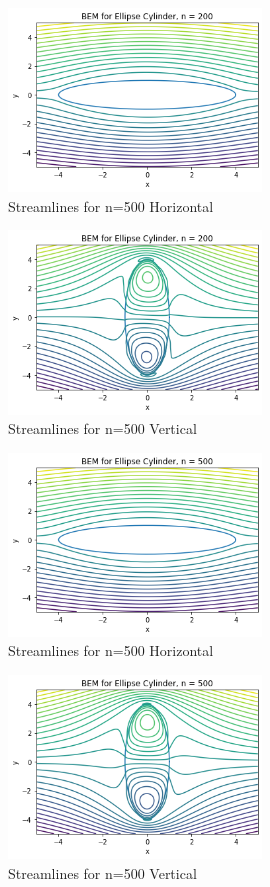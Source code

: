 \documentclass{article}
\begin{document}
		\begin{figure}[H]
			\centering
			\includegraphics[width=0.6\textwidth]{images/e2001.png}
			\caption{ Streamlines for n=500 Horizontal }
		\end{figure}
		
		\begin{figure}[H]
			\centering
			\includegraphics[width=0.6\textwidth]{images/e2002.png}
			\caption{ Streamlines for n=500 Vertical }
		\end{figure}
		
		\begin{figure}[H]
			\centering
			\includegraphics[width=0.6\textwidth]{images/e5001.png}
			\caption{ Streamlines for n=500 Horizontal }
		\end{figure}
		
		\begin{figure}[H]
			\centering
			\includegraphics[width=0.6\textwidth]{images/e5002.png}
			\caption{ Streamlines for n=500 Vertical }
		\end{figure}
		
\end{document}
